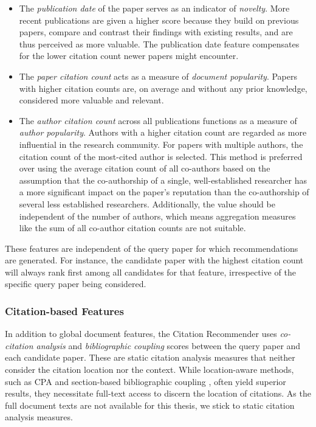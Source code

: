 \begin{itemize}
    \item The \emph{publication date} of the paper serves as an indicator of \emph{novelty}. More recent publications are given a higher score because they build on previous papers, compare and contrast their findings with existing results, and are thus perceived as more valuable. The publication date feature compensates for the lower citation count newer papers might encounter.
    \item The \emph{paper citation count} acts as a measure of \emph{document popularity}. Papers with higher citation counts are, on average and without any prior knowledge, considered more valuable and relevant.
    \item The \emph{author citation count} across all publications functions as a measure of \emph{author popularity}. Authors with a higher citation count are regarded as more influential in the research community. For papers with multiple authors, the citation count of the most-cited author is selected. This method is preferred over using the average citation count of all co-authors based on the assumption that the co-authorship of a single, well-established researcher has a more significant impact on the paper's reputation than the co-authorship of several less established researchers. Additionally, the value should be independent of the number of authors, which means aggregation measures like the sum of all co-author citation counts are not suitable.
\end{itemize}

These features are independent of the query paper for which recommendations are generated. For instance, the candidate paper with the highest citation count will always rank first among all candidates for that feature, irrespective of the specific query paper being considered.


\subsubsection*{Citation-based Features}

In addition to global document features, the Citation Recommender uses \emph{co-citation analysis} \cite{SmallCocitationScientific1973,Marshakova-ShaikevichSystemDocument1973} and \emph{bibliographic coupling} \cite{KesslerBibliographicCoupling1963} scores between the query paper and each candidate paper.
These are static citation analysis measures that neither consider the citation location nor the context.
While location-aware methods, such as \ac{CPA} \cite{GippCitationProximity2009} and section-based bibliographic coupling \cite{HabibSectionsbasedBibliographic2019}, often yield superior results, they necessitate full-text access to discern the location of citations.
As the full document texts are not available for this thesis, we stick to static citation analysis measures.

